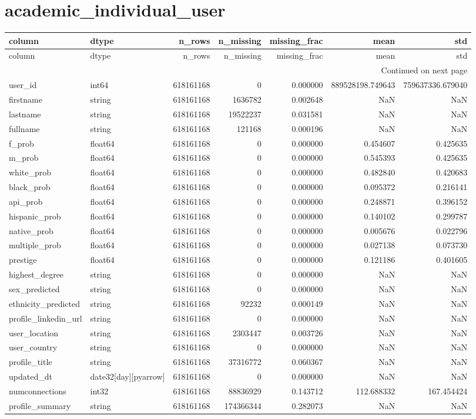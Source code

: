 \documentclass{article}
\begin{document}
\section*{academic_individual_user}
\begin{longtable}{llrrrrr}
\toprule
column & dtype & n_rows & n_missing & missing_frac & mean & std \\
\midrule
\endfirsthead
\toprule
column & dtype & n_rows & n_missing & missing_frac & mean & std \\
\midrule
\endhead
\midrule
\multicolumn{7}{r}{Continued on next page} \\
\midrule
\endfoot
\bottomrule
\endlastfoot
user_id & int64 & 618161168 & 0 & 0.000000 & 889528198.749643 & 759637336.679040 \\
firstname & string & 618161168 & 1636782 & 0.002648 & NaN & NaN \\
lastname & string & 618161168 & 19522237 & 0.031581 & NaN & NaN \\
fullname & string & 618161168 & 121168 & 0.000196 & NaN & NaN \\
f_prob & float64 & 618161168 & 0 & 0.000000 & 0.454607 & 0.425635 \\
m_prob & float64 & 618161168 & 0 & 0.000000 & 0.545393 & 0.425635 \\
white_prob & float64 & 618161168 & 0 & 0.000000 & 0.482840 & 0.420683 \\
black_prob & float64 & 618161168 & 0 & 0.000000 & 0.095372 & 0.216141 \\
api_prob & float64 & 618161168 & 0 & 0.000000 & 0.248871 & 0.396152 \\
hispanic_prob & float64 & 618161168 & 0 & 0.000000 & 0.140102 & 0.299787 \\
native_prob & float64 & 618161168 & 0 & 0.000000 & 0.005676 & 0.022796 \\
multiple_prob & float64 & 618161168 & 0 & 0.000000 & 0.027138 & 0.073730 \\
prestige & float64 & 618161168 & 0 & 0.000000 & 0.121186 & 0.401605 \\
highest_degree & string & 618161168 & 0 & 0.000000 & NaN & NaN \\
sex_predicted & string & 618161168 & 0 & 0.000000 & NaN & NaN \\
ethnicity_predicted & string & 618161168 & 92232 & 0.000149 & NaN & NaN \\
profile_linkedin_url & string & 618161168 & 0 & 0.000000 & NaN & NaN \\
user_location & string & 618161168 & 2303447 & 0.003726 & NaN & NaN \\
user_country & string & 618161168 & 0 & 0.000000 & NaN & NaN \\
profile_title & string & 618161168 & 37316772 & 0.060367 & NaN & NaN \\
updated_dt & date32[day][pyarrow] & 618161168 & 0 & 0.000000 & NaN & NaN \\
numconnections & int32 & 618161168 & 88836929 & 0.143712 & 112.688332 & 167.454424 \\
profile_summary & string & 618161168 & 174366344 & 0.282073 & NaN & NaN \\
\end{longtable}
\end{document}
